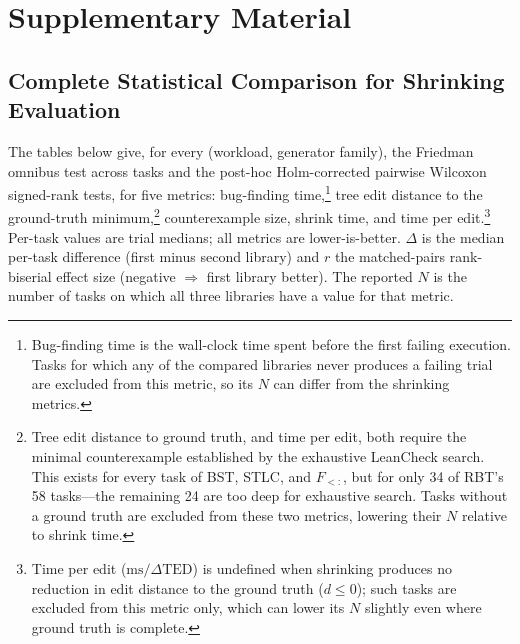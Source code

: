 \appendix
\renewcommand{\thechapter}{A}
\renewcommand{\chaptername}{Appendix}

\chapter{Supplementary Material}

\section{Complete Statistical Comparison for Shrinking Evaluation}\label{shrinkeval:app:stats}

The tables below give, for every (workload, generator family), the Friedman omnibus
test across tasks and the post-hoc Holm-corrected pairwise Wilcoxon signed-rank tests,
for five metrics: bug-finding time,\footnote{Bug-finding time is the wall-clock time
    spent before the first failing execution. Tasks for which any of the compared libraries
    never produces a failing trial are excluded from this metric, so its $N$ can differ
    from the shrinking metrics.} tree edit distance to the ground-truth
minimum,\footnote{Tree edit distance to ground truth, and time per edit, both require
    the minimal counterexample established by the exhaustive LeanCheck search. This exists
    for every task of BST, STLC, and $F_{<:}$, but for only 34 of RBT's 58 tasks---the
    remaining 24 are too deep for exhaustive search. Tasks without a ground truth are
    excluded from these two metrics, lowering their $N$ relative to shrink time.}
counterexample size, shrink time, and time per edit.\footnote{Time per edit
    ($\mathrm{ms}/\Delta\mathrm{TED}$) is undefined when shrinking produces no reduction in
    edit distance to the ground truth ($d \le 0$); such tasks are excluded from this metric
    only, which can lower its $N$ slightly even where ground truth is complete.} Per-task
values are trial medians; all metrics are lower-is-better. $\Delta$ is the median
per-task difference (first minus second library) and $r$ the matched-pairs
rank-biserial effect size (negative $\Rightarrow$ first library better). The reported
$N$ is the number of tasks on which all three libraries have a value for that metric.

